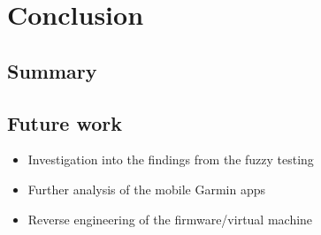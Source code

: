 \section{Conclusion}
\subsection{Summary}
\subsection{Future work}


\begin{itemize}
    \item Investigation into the findings from the fuzzy testing
    \item Further analysis of the mobile Garmin apps
    \item Reverse engineering of the firmware/virtual machine
\end{itemize}